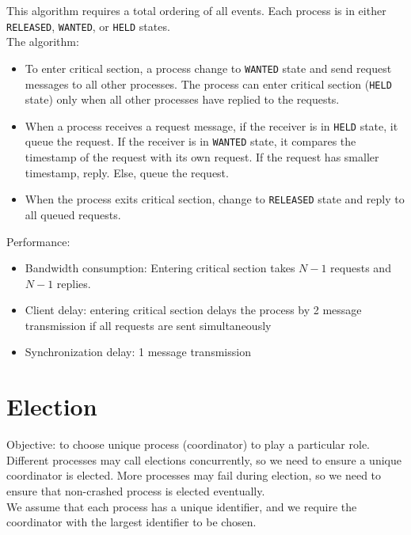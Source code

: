 \begin{multicols*}{2}
\noindent This algorithm requires a total ordering of all events. Each process is in either \verb|RELEASED|, \verb|WANTED|, or \verb|HELD| states.\\

\noindent The algorithm:
\begin{itemize}
  \item To enter critical section, a process change to \verb|WANTED| state and send request messages to all other processes. The process can enter critical section (\verb|HELD| state) only when all other processes have replied to the requests.
  \item When a process receives a request message, if the receiver is in \verb|HELD| state, it queue the request. If the receiver is in \verb|WANTED| state, it compares the timestamp of the request with its own request. If the request has smaller timestamp, reply. Else, queue the request.
  \item When the process exits critical section, change to \verb|RELEASED| state and reply to all queued requests.
\end{itemize}

\noindent Performance:

\begin{itemize}
  \item Bandwidth consumption: Entering critical section takes $N-1$ requests and $N-1$ replies.
  \item Client delay: entering critical section delays the process by 2 message transmission if all requests are sent simultaneously
  \item Synchronization delay: 1 message transmission
\end{itemize}

\section{Election}

\noindent Objective: to choose unique process (coordinator) to play a particular role.\\

\noindent Different processes may call elections concurrently, so we need to ensure a unique coordinator is elected. More processes may fail during election, so we need to ensure that non-crashed process is elected eventually.\\

\noindent We assume that each process has a unique identifier, and we require the coordinator with the largest identifier to be chosen.\\


\end{multicols*}
